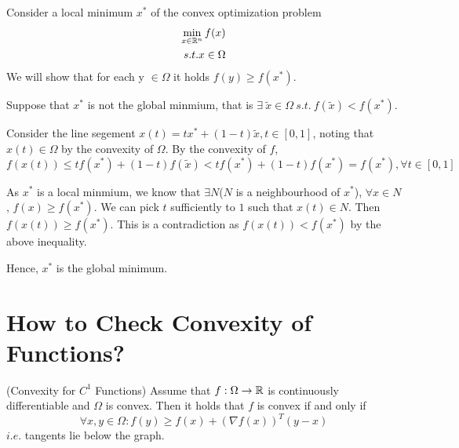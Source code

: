 \begin{proofsolution}
   
    \textcolor{LightRed}{
        Consider a local minimum $x^*$ of the convex optimization problem
        \begin{equation}
            \begin{split}
                \min_{x\in \mathbb{R}^n} f(x)\\
                s.t. x\in \Omega \nonumber
            \end{split}
        \end{equation}
        We will show that for each y $\in \Omega$ it holds $f(y)\geq f(x^*)$. 
    }

    Suppose that $x^*$ is not the global minmium, that is $\exists \ \widetilde{x} \in \Omega \ s.t. \ f(\widetilde{x})<f(x^*)$. \par
    Consider the line segement $x(t)=tx^*+(1-t)\widetilde{x}, t\in [0,1]$, 
        noting that $x(t)\in \Omega$ by the convexity of $\Omega$. 
        By the convexity of $f$,
        \begin{equation*}
            f(x(t))\leq tf(x^*)+(1-t)f(\widetilde{x})<tf(x^*)+(1-t)f(x^*)=f(x^*),\forall t\in [0,1]
        \end{equation*}
    \par
    As $x^*$ is a local minmium, we know that $\exists N$($N$ is a neighbourhood of $x^*$), $\forall x\in N$, $f(x)\geq f(x^*)$. 
        We can pick $t$ sufficiently to $1$ such that $x(t) \in N$. Then $f(x(t)) \geq  f(x^*)$. 
        This is a contradiction as $f(x(t)) < f(x^*)$ by the above inequality.
    \par
    Hence, $x^*$ is the global minimum. 
\end{proofsolution}



\section{How to Check Convexity of Functions?}

\begin{theorem}{
    (Convexity for $C^1$ Functions)
}{}
    {
        Assume that $f:\Omega\rightarrow\mathbb{R}$ is continuously differentiable
        and $\Omega$ is convex. Then it holds that $f$ is convex if and only if 
        \begin{equation}\label{eq:one_order_convexity_check}
            \forall x,y \in \Omega : f(y)\geq f(x) + (\nabla f(x))^T(y-x)
        \end{equation}
        $i.e.$ tangents lie below the graph. \\
    }
\end{theorem}

